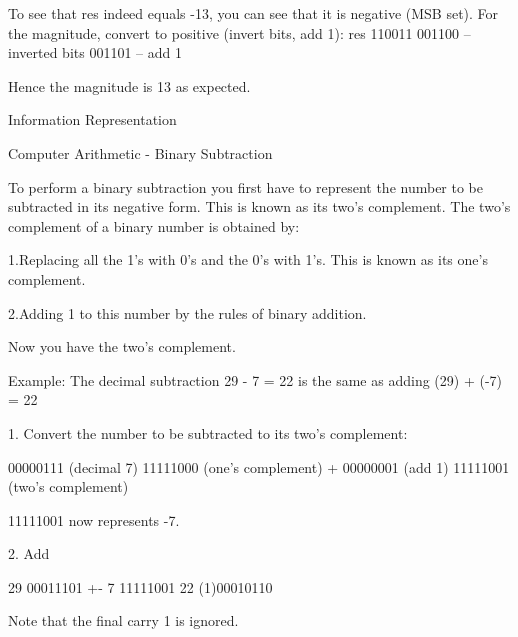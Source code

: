 To see that res indeed equals -13, you can see that it is negative (MSB set). For the magnitude, convert to positive (invert bits, add 1):
res  110011
     001100  -- inverted bits
     001101  -- add 1


Hence the magnitude is 13 as expected.



Information Representation 

 Computer Arithmetic - Binary Subtraction     
 




 To perform a binary subtraction you first have to represent the number to be subtracted in its negative form. This is known as its two's complement.
The two's complement of a binary number is obtained by:


1.Replacing all the 1's with 0's and the 0's with 1's. This is known as its one's complement.


2.Adding 1 to this number by the rules of binary addition.


 Now you have the two's complement.

Example:
 The decimal subtraction 29 - 7 = 22 is the same as adding (29) + (-7) = 22


1. Convert the number to be subtracted to its two's complement: 



00000111 (decimal 7) 
11111000 (one's complement) 
+ 00000001 (add 1) 
11111001 (two's complement) 

11111001 now represents -7.



2. Add



29 00011101 
+- 7 11111001 
22 (1)00010110 

Note that the final carry 1 is ignored.




 
